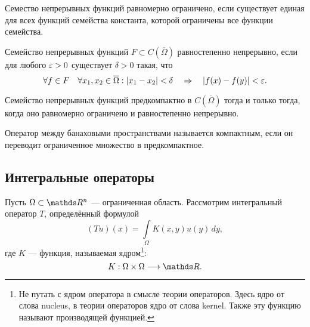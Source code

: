 \begin{definition}
Семество непрерывных функций равномерно ограничено, если существует единая для всех функций семейства константа, которой ограничены все функции семейства.
\end{definition}

\begin{definition}
Семейство непрерывных функций $F \subset C(\overline{\Omega})$ равностепенно непрерывно, если для любого $\varepsilon >0$  существует $\delta >0$ такая, что
$$ \forall f \in F \quad \forall x_1,x_2 \in \overline{\Omega} : | x_1 - x_2 | < \delta \quad \Rightarrow \quad |f(x) - f(y)| < \varepsilon .$$ 
\end{definition}

\begin{theorem}
Семейство непрерывных функций предкомпактно в $C(\overline{\Omega})$ тогда и только тогда, когда оно равномерно ограничено и равностепенно непрерывно.
\end{theorem}

\begin{definition}
Оператор между банаховыми пространствами называется компактным, если он переводит ограниченное множество в предкомпактное.
\end{definition}

\subsection{Интегральные операторы}
Пусть $\Omega \subset \real^n$ --- ограниченная область.
Рассмотрим интегральный оператор $T$, определённый формулой
$$ (Tu)(x) = \int \limits_\Omega K(x,y) u(y) \, dy,$$
где $K$ --- функция, называемая ядром\footnote{Не путать с ядром оператора в смысле теории операторов. Здесь ядро от слова nucleus, в теории операторов ядро от слова kernel. Также эту функцию называют производящей функцией.}:
$$ K : \Omega \times \Omega \longrightarrow \real.$$

